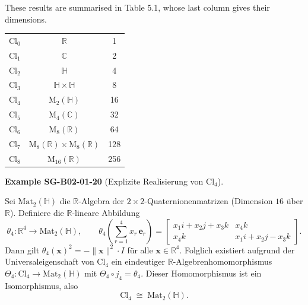 \documentclass[10pt, letterpaper]{article}
\newcommand{\R}{\mathbb{R}}
\newcommand{\QU}{\mathbb{H}}
\newcommand{\Cl}{\mathrm{Cl}}
\newcommand{\Mat}{\mathrm{Mat}}
\newcommand{\CustomHeading}[3]{%
  \par\medskip\noindent%
  \textbf{#1 #2} \textnormal{(#3)}.\enskip%
}
\newenvironment{EXA}[2]{\begin{unitbox}\CustomHeading{Example}{#1}{#2}}{\end{unitbox}}
\begin{document}
These results are summarised in Table 5.1, whose last column gives their dimensions.

\begin{table}[h]
\begin{center}
\begin{tabular}{|c|c|c|}
\hline
$\mathrm{Cl}_{0}$ & $\mathbb{R}$ & 1 \\
$\mathrm{Cl}_{1}$ & $\mathbb{C}$ & 2 \\
$\mathrm{Cl}_{2}$ & $\mathbb{H}$ & 4 \\
$\mathrm{Cl}_{3}$ & $\mathbb{H} \times \mathbb{H}$ & 8 \\
$\mathrm{Cl}_{4}$ & $\mathrm{M}_{2}(\mathbb{H})$ & 16 \\
$\mathrm{Cl}_{5}$ & $\mathrm{M}_{4}(\mathbb{C})$ & 32 \\
$\mathrm{Cl}_{6}$ & $\mathrm{M}_{8}(\mathbb{R})$ & 64 \\
$\mathrm{Cl}_{7}$ & $\mathrm{M}_{8}(\mathbb{R}) \times \mathrm{M}_{8}(\mathbb{R})$ & 128 \\
$\mathrm{Cl}_{8}$ & $\mathrm{M}_{16}(\mathbb{R})$ & 256 \\
\hline
\end{tabular}
\end{center}
\end{table}




\begin{EXA}{SG-B02-01-20}{Explizite Realisierung von \(\Cl_4\)}
Sei \(\Mat_2(\QU)\) die \(\R\)-Algebra der \(2\times2\)-Quaternionenmatrizen (Dimension \(16\) über \(\R\)).
Definiere die \(\R\)-lineare Abbildung
\[
\theta_4:\R^4\longrightarrow \Mat_2(\QU),\qquad
\theta_4\!\left(\sum_{r=1}^4 x_r\,\mathbf e_r\right)
=
\begin{bmatrix}
x_1 i + x_2 j + x_3 k & x_4 k\\
x_4 k & x_1 i + x_2 j - x_3 k
\end{bmatrix}.
\]
Dann gilt \(\theta_4(\mathbf x)^2=-\|\mathbf x\|^2\cdot I\) für alle \(\mathbf x\in\R^4\).
Folglich existiert aufgrund der Universal­eigenschaft von \(\Cl_4\) ein eindeutiger
\(\R\)-Algebrenhomomorphismus \(\Theta_4:\Cl_4\to \Mat_2(\QU)\) mit \(\Theta_4\circ j_4=\theta_4\).
Dieser Homomorphismus ist ein Isomorphismus, also
\[
\Cl_4 \;\cong\; \Mat_2(\QU).
\]
\end{EXA}
\end{document}
